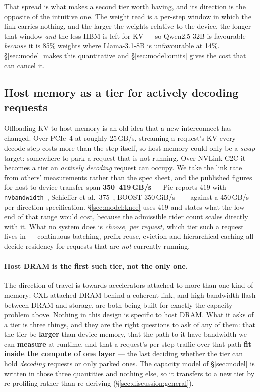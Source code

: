 That spread is what makes a second tier worth having, and its direction is the
opposite of the intuitive one. The weight read is a per-step window in which the link
carries nothing, and the larger the weights relative to the device, the longer that
window \emph{and} the less HBM is left for KV --- so Qwen2.5-32B is favourable
\emph{because} it is 85\% weights where Llama-3.1-8B is unfavourable at 14\%.
\S\ref{sec:model} makes this quantitative and \S\ref{sec:model:omits} gives the cost
that can cancel it.

\subsection{Host memory as a tier for actively decoding requests}

Offloading KV to host memory is an old idea that a new interconnect has changed.
Over PCIe~4 at roughly 25\,GB/s, streaming a request's KV every decode step costs
more than the step itself, so host memory could only be a \emph{swap} target:
somewhere to park a request that is not running. Over NVLink-C2C it becomes a tier
an \emph{actively decoding} request can occupy. We take the link rate from others'
measurements rather than the spec sheet, and the published figures for host-to-device
transfer span \textbf{350--419\,GB/s} --- Pie reports $419$ with
\texttt{nvbandwidth}~\cite{pie}, Schieffer et al.\ $375$~\cite{schieffer2024}, BOOST
$350$\,GiB/s~\cite{boost} --- against a $450$\,GB/s per-direction specification.
\S\ref{sec:model:knee} uses $419$ and states what the low end of that range would
cost, because the admissible rider count scales directly with it. What no
system does is \emph{choose, per request,} which tier such a request lives in ---
continuous batching, prefix reuse, eviction and hierarchical caching all decide
residency for requests that are \emph{not} currently running.

\paragraph{Host DRAM is the first such tier, not the only one.} The direction of
travel is towards accelerators attached to more than one kind of memory:
CXL-attached DRAM behind a coherent link, and high-bandwidth flash between DRAM and
storage, are both being built for exactly the capacity problem above. Nothing in
this design is specific to host DRAM. What it asks of a tier is three things, and
they are the right questions to ask of any of them: that the tier be
\textbf{larger} than device memory, that the path to it have bandwidth we can
\textbf{measure} at runtime, and that a request's per-step traffic over that path
\textbf{fit inside the compute of one layer} --- the last deciding whether the tier
can hold \emph{decoding} requests or only parked ones. The capacity model of
\S\ref{sec:model} is written in those three quantities and nothing else, so it
transfers to a new tier by re-profiling rather than re-deriving
(\S\ref{sec:discussion:general}).


